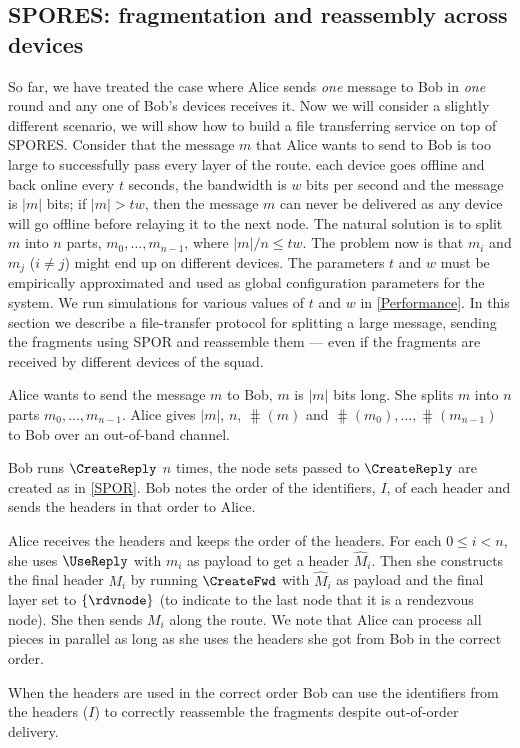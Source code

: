 \subsection{\acs{SPORES}: fragmentation and reassembly across devices}%
\label{SPORES}%
\label{sec:file_transfer}

So far, we have treated the case where Alice sends \emph{one} message to Bob in 
\emph{one} round and any one of Bob's devices receives it.
Now we will consider a slightly different scenario, we will show how to build a 
file transferring service on top of \ac{SPORES}.
Consider that the message \(m\) that Alice wants to send to Bob is too large to 
successfully pass every layer of the route.
\Eg each device goes offline and back online every \(t\) seconds, the bandwidth 
is \(w\) bits per second and the message is \(|m|\) bits; if \(|m| > t w\), 
then the message \(m\) can never be delivered as any device will go offline 
before relaying it to the next node.
The natural solution is to split \(m\) into \(n\) parts, \(m_0, \dotsc, 
  m_{n-1}\), where \(|m|/n\leq t w\).
The problem now is that \(m_i\) and \(m_j\) (\(i\neq j\)) might end up on 
different devices.
The parameters \(t\) and \(w\) must be empirically approximated and used as 
global configuration parameters for the system.
We run simulations for various values of \(t\) and \(w\) in \cref{Performance}.
In this section we describe a file-transfer protocol for splitting a large 
message, sending the fragments using \ac{SPOR} and reassemble them --- even if 
the fragments are received by different devices of the squad.

Alice wants to send the message \(m\) to Bob, \(m\) is \(|m|\) bits long.
She splits \(m\) into \(n\) parts \(m_0, \dotsc, m_{n-1}\).
Alice gives \(|m|\), \(n\), \(\hash(m)\) and \(\hash(m_0), \dotsc, 
  \hash(m_{n-1})\) to Bob over an out-of-band channel.

Bob runs \(\CreateReply\) \(n\) times, the node sets passed to \(\CreateReply\) 
are created as in \cref{SPOR}.
Bob notes the order of the identifiers, \(I\), of each header and sends the 
headers in that order to Alice.

Alice receives the headers and keeps the order of the headers.
For each \(0\leq i < n\), she uses \(\UseReply\) with \(m_i\) as payload to get 
a header \(\hat M_i\).
Then she constructs the final header \(M_i\) by running \(\CreateFwd\) with 
\(\hat M_i\) as payload and the final layer set to \(\{\rdvnode\}\) (to 
indicate to the last node that it is a rendezvous node).
She then sends \(M_i\) along the route.
We note that Alice can process all pieces in parallel as long as she uses the 
headers she got from Bob in the correct order.

When the headers are used in the correct order Bob can use the identifiers from 
the headers (\(I\)) to correctly reassemble the fragments despite out-of-order 
delivery.

